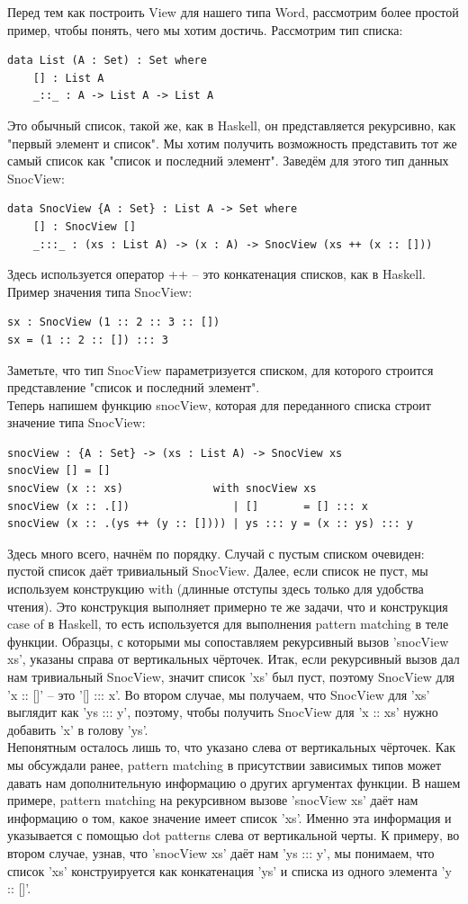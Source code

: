\documentclass[8pt]{extarticle}
\begin{document}
Перед тем как построить View для нашего типа Word, рассмотрим более простой пример, чтобы понять, чего мы хотим достичь.
Рассмотрим тип списка:
\begin{lstlisting}
data List (A : Set) : Set where
	[] : List A
	_::_ : A -> List A -> List A
\end{lstlisting}
Это обычный список, такой же, как в Haskell, он представляется рекурсивно, как "первый элемент и список". Мы хотим получить возможность представить тот же самый список как "список и последний элемент". Заведём для этого тип данных SnocView:
\begin{lstlisting}
data SnocView {A : Set} : List A -> Set where
	[] : SnocView []
	_:::_ : (xs : List A) -> (x : A) -> SnocView (xs ++ (x :: []))
\end{lstlisting}
Здесь используется оператор ++ -- это конкатенация списков, как в Haskell. Пример значения типа SnocView:
\begin{lstlisting}
sx : SnocView (1 :: 2 :: 3 :: [])
sx = (1 :: 2 :: []) ::: 3
\end{lstlisting}
Заметьте, что тип SnocView параметризуется списком, для которого строится представление "список и последний элемент".\\
Теперь напишем функцию snocView, которая для переданного списка строит значение типа SnocView:
\begin{lstlisting}
snocView : {A : Set} -> (xs : List A) -> SnocView xs
snocView [] = []
snocView (x :: xs)              with snocView xs
snocView (x :: .[])                | []       = [] ::: x
snocView (x :: .(ys ++ (y :: []))) | ys ::: y = (x :: ys) ::: y
\end{lstlisting}
Здесь много всего, начнём по порядку. Случай с пустым списком очевиден: пустой список даёт тривиальный SnocView. Далее, если список не пуст, мы используем конструкцию with (длинные отступы здесь только для удобства чтения). Это конструкция выполняет примерно те же задачи, что и конструкция case of в Haskell, то есть используется для выполнения pattern matching в теле функции. Образцы, с которыми мы сопоставляем рекурсивный вызов 'snocView xs', указаны справа от вертикальных чёрточек. Итак, если рекурсивный вызов дал нам тривиальный SnocView, значит список 'xs' был пуст, поэтому SnocView для 'x :: []' -- это '[] ::: x'. Во втором случае, мы получаем, что SnocView для 'xs' выглядит как 'ys ::: y', поэтому, чтобы получить SnocView для 'x :: xs' нужно добавить 'x' в голову 'ys'.\\
Непонятным осталось лишь то, что указано слева от вертикальных чёрточек. Как мы обсуждали ранее, pattern matching в присутствии зависимых типов может давать нам дополнительную информацию о других аргументах функции. В нашем примере, pattern matching на рекурсивном вызове 'snocView xs' даёт нам информацию о том, какое значение имеет список 'xs'. Именно эта информация и указывается с помощью dot patterns слева от вертикальной черты. К примеру, во втором случае, узнав, что 'snocView xs' даёт нам 'ys ::: y', мы понимаем, что список 'xs' конструируется как конкатенация 'ys' и списка из одного элемента 'y :: []'.\\
\end{document}
